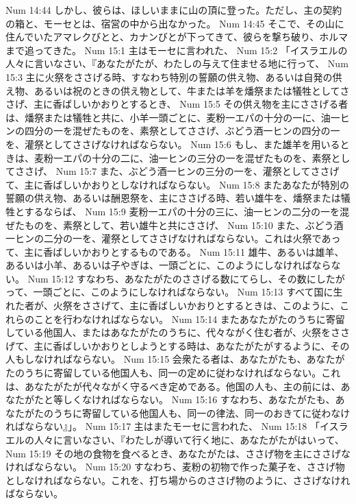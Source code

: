 Num 14:44  しかし、彼らは、ほしいままに山の頂に登った。ただし、主の契約の箱と、モーセとは、宿営の中から出なかった。
Num 14:45  そこで、その山に住んでいたアマレクびとと、カナンびとが下ってきて、彼らを撃ち破り、ホルマまで追ってきた。
Num 15:1  主はモーセに言われた、
Num 15:2  「イスラエルの人々に言いなさい、『あなたがたが、わたしの与えて住ませる地に行って、
Num 15:3  主に火祭をささげる時、すなわち特別の誓願の供え物、あるいは自発の供え物、あるいは祝のときの供え物として、牛または羊を燔祭または犠牲としてささげ、主に香ばしいかおりとするとき、
Num 15:5  その供え物を主にささげる者は、燔祭または犠牲と共に、小羊一頭ごとに、麦粉一エパの十分の一に、油一ヒンの四分の一を混ぜたものを、素祭としてささげ、ぶどう酒一ヒンの四分の一を、灌祭としてささげなければならない。
Num 15:6  もし、また雄羊を用いるときは、麦粉一エパの十分の二に、油一ヒンの三分の一を混ぜたものを、素祭としてささげ、
Num 15:7  また、ぶどう酒一ヒンの三分の一を、灌祭としてささげて、主に香ばしいかおりとしなければならない。
Num 15:8  またあなたが特別の誓願の供え物、あるいは酬恩祭を、主にささげる時、若い雄牛を、燔祭または犠牲とするならば、
Num 15:9  麦粉一エパの十分の三に、油一ヒンの二分の一を混ぜたものを、素祭として、若い雄牛と共にささげ、
Num 15:10  また、ぶどう酒一ヒンの二分の一を、灌祭としてささげなければならない。これは火祭であって、主に香ばしいかおりとするものである。
Num 15:11  雄牛、あるいは雄羊、あるいは小羊、あるいは子やぎは、一頭ごとに、このようにしなければならない。
Num 15:12  すなわち、あなたがたのささげる数にてらし、その数にしたがって、一頭ごとに、このようにしなければならない。
Num 15:13  すべて国に生れた者が、火祭をささげて、主に香ばしいかおりとするときは、このように、これらのことを行わなければならない。
Num 15:14  またあなたがたのうちに寄留している他国人、またはあなたがたのうちに、代々ながく住む者が、火祭をささげて、主に香ばしいかおりとしようとする時は、あなたがたがするように、その人もしなければならない。
Num 15:15  会衆たる者は、あなたがたも、あなたがたのうちに寄留している他国人も、同一の定めに従わなければならない。これは、あなたがたが代々ながく守るべき定めである。他国の人も、主の前には、あなたがたと等しくなければならない。
Num 15:16  すなわち、あなたがたも、あなたがたのうちに寄留している他国人も、同一の律法、同一のおきてに従わなければならない』」。
Num 15:17  主はまたモーセに言われた、
Num 15:18  「イスラエルの人々に言いなさい、『わたしが導いて行く地に、あなたがたがはいって、
Num 15:19  その地の食物を食べるとき、あなたがたは、ささげ物を主にささげなければならない。
Num 15:20  すなわち、麦粉の初物で作った菓子を、ささげ物としなければならない。これを、打ち場からのささげ物のように、ささげなければならない。
